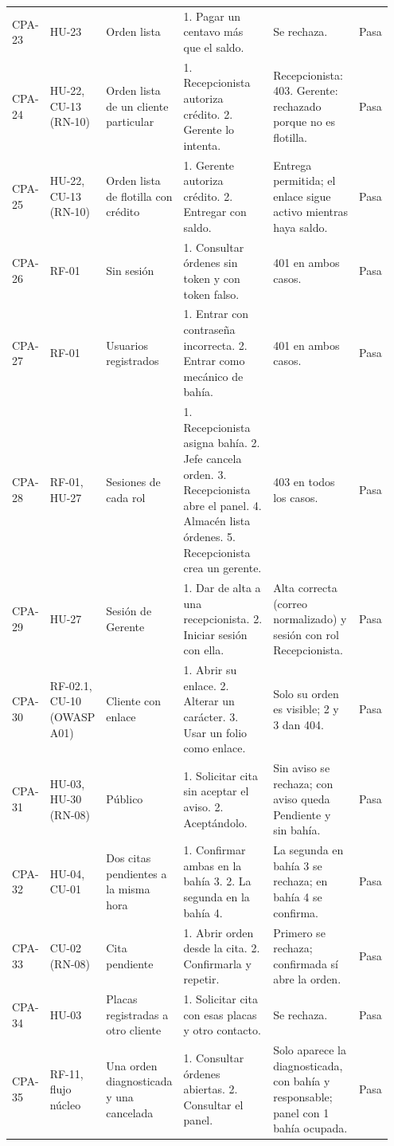 {\begin{longtable}{@{}L{0.07\linewidth}L{0.13\linewidth}L{0.17\linewidth}L{0.27\linewidth}L{0.24\linewidth}L{0.07\linewidth}@{}}
CPA-23 & HU-23 & Orden lista & 1. Pagar un centavo más que el saldo. & Se rechaza. & Pasa \\
CPA-24 & HU-22, CU-13 (RN-10) & Orden lista de un cliente particular & 1. Recepcionista autoriza crédito. 2. Gerente lo intenta. & Recepcionista: 403. Gerente: rechazado porque no es flotilla. & Pasa \\
CPA-25 & HU-22, CU-13 (RN-10) & Orden lista de flotilla con crédito & 1. Gerente autoriza crédito. 2. Entregar con saldo. & Entrega permitida; el enlace sigue activo mientras haya saldo. & Pasa \\
CPA-26 & RF-01 & Sin sesión & 1. Consultar órdenes sin token y con token falso. & 401 en ambos casos. & Pasa \\
CPA-27 & RF-01 & Usuarios registrados & 1. Entrar con contraseña incorrecta. 2. Entrar como mecánico de bahía. & 401 en ambos casos. & Pasa \\
CPA-28 & RF-01, HU-27 & Sesiones de cada rol & 1. Recepcionista asigna bahía. 2. Jefe cancela orden. 3. Recepcionista abre el panel. 4. Almacén lista órdenes. 5. Recepcionista crea un gerente. & 403 en todos los casos. & Pasa \\
CPA-29 & HU-27 & Sesión de Gerente & 1. Dar de alta a una recepcionista. 2. Iniciar sesión con ella. & Alta correcta (correo normalizado) y sesión con rol Recepcionista. & Pasa \\
CPA-30 & RF-02.1, CU-10 (OWASP A01) & Cliente con enlace & 1. Abrir su enlace. 2. Alterar un carácter. 3. Usar un folio como enlace. & Solo su orden es visible; 2 y 3 dan 404. & Pasa \\
CPA-31 & HU-03, HU-30 (RN-08) & Público & 1. Solicitar cita sin aceptar el aviso. 2. Aceptándolo. & Sin aviso se rechaza; con aviso queda Pendiente y sin bahía. & Pasa \\
CPA-32 & HU-04, CU-01 & Dos citas pendientes a la misma hora & 1. Confirmar ambas en la bahía 3. 2. La segunda en la bahía 4. & La segunda en bahía 3 se rechaza; en bahía 4 se confirma. & Pasa \\
CPA-33 & CU-02 (RN-08) & Cita pendiente & 1. Abrir orden desde la cita. 2. Confirmarla y repetir. & Primero se rechaza; confirmada sí abre la orden. & Pasa \\
CPA-34 & HU-03 & Placas registradas a otro cliente & 1. Solicitar cita con esas placas y otro contacto. & Se rechaza. & Pasa \\
CPA-35 & RF-11, flujo núcleo & Una orden diagnosticada y una cancelada & 1. Consultar órdenes abiertas. 2. Consultar el panel. & Solo aparece la diagnosticada, con bahía y responsable; panel con 1 bahía ocupada. & Pasa \\
\end{longtable}
}

